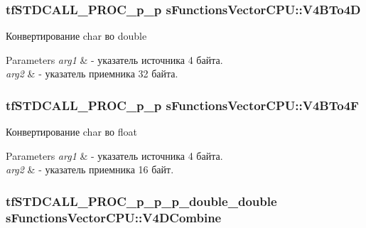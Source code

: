 \hypertarget{structs_functions_vector_c_p_u_a26408f37bdf3ab2e7f3b8b0cd17f6b30}{
\subsubsection[{V4\-B\-To4\-D}]{\setlength{\rightskip}{0pt plus 5cm}tf\-S\-T\-D\-C\-A\-L\-L\-\_\-\-P\-R\-O\-C\-\_\-p\-\_\-p s\-Functions\-Vector\-C\-P\-U\-::\-V4\-B\-To4\-D}}\label{structs_functions_vector_c_p_u_a26408f37bdf3ab2e7f3b8b0cd17f6b30}
Конвертирование char во double 
\begin{DoxyParams}{Parameters}
{\em arg1} & -\/ указатель источника 4 байта. \\
\hline
{\em arg2} & -\/ указатель приемника 32 байта. \\
\hline
\end{DoxyParams}
\hypertarget{structs_functions_vector_c_p_u_ac2aee16ff45102e4ed7a56a3e8c213d9}{
\subsubsection[{V4\-B\-To4\-F}]{\setlength{\rightskip}{0pt plus 5cm}tf\-S\-T\-D\-C\-A\-L\-L\-\_\-\-P\-R\-O\-C\-\_\-p\-\_\-p s\-Functions\-Vector\-C\-P\-U\-::\-V4\-B\-To4\-F}}\label{structs_functions_vector_c_p_u_ac2aee16ff45102e4ed7a56a3e8c213d9}
Конвертирование char во float 
\begin{DoxyParams}{Parameters}
{\em arg1} & -\/ указатель источника 4 байта. \\
\hline
{\em arg2} & -\/ указатель приемника 16 байт. \\
\hline
\end{DoxyParams}
\hypertarget{structs_functions_vector_c_p_u_a0bb14800e832c773a886e41947996171}{
\subsubsection[{V4\-D\-Combine}]{\setlength{\rightskip}{0pt plus 5cm}tf\-S\-T\-D\-C\-A\-L\-L\-\_\-\-P\-R\-O\-C\-\_\-p\-\_\-p\-\_\-p\-\_\-double\-\_\-double s\-Functions\-Vector\-C\-P\-U\-::\-V4\-D\-Combine}}\label{structs_functions_vector_c_p_u_a0bb14800e832c773a886e41947996171}
